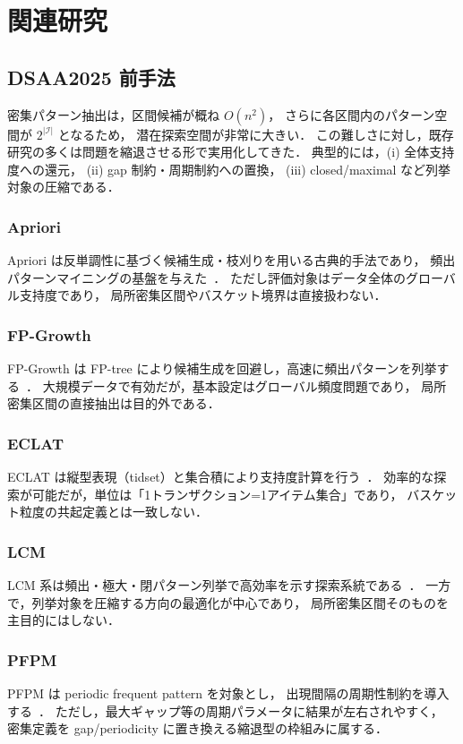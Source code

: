 \section{関連研究}
\label{sec:related_works}

\subsection{DSAA2025 前手法}
\label{sec:related_pre_dsaa}

密集パターン抽出は，区間候補が概ね $O(n^2)$，
さらに各区間内のパターン空間が $2^{|\mathcal{I}|}$ となるため，
潜在探索空間が非常に大きい．
この難しさに対し，既存研究の多くは問題を縮退させる形で実用化してきた．
典型的には，(i) 全体支持度への還元，
(ii) gap 制約・周期制約への置換，
(iii) closed/maximal など列挙対象の圧縮である．

\subsubsection{Apriori}
Apriori は反単調性に基づく候補生成・枝刈りを用いる古典的手法であり，
頻出パターンマイニングの基盤を与えた~\cite{agrawal1994fast}．
ただし評価対象はデータ全体のグローバル支持度であり，
局所密集区間やバスケット境界は直接扱わない．

\subsubsection{FP-Growth}
FP-Growth は FP-tree により候補生成を回避し，高速に頻出パターンを列挙する~\cite{han2000mining}．
大規模データで有効だが，基本設定はグローバル頻度問題であり，
局所密集区間の直接抽出は目的外である．

\subsubsection{ECLAT}
ECLAT は縦型表現（tidset）と集合積により支持度計算を行う~\cite{zaki1997new}．
効率的な探索が可能だが，単位は「1トランザクション=1アイテム集合」であり，
バスケット粒度の共起定義とは一致しない．

\subsubsection{LCM}
LCM 系は頻出・極大・閉パターン列挙で高効率を示す探索系統である~\cite{fournier2017survey}．
一方で，列挙対象を圧縮する方向の最適化が中心であり，
局所密集区間そのものを主目的にはしない．

\subsubsection{PFPM}
PFPM は periodic frequent pattern を対象とし，
出現間隔の周期性制約を導入する~\cite{tanbeer2009discovering}．
ただし，最大ギャップ等の周期パラメータに結果が左右されやすく，
密集定義を gap/periodicity に置き換える縮退型の枠組みに属する．


